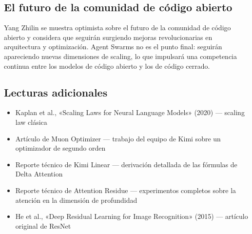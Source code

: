 \documentclass[a4paper]{article}
\begin{document}
\subsection{El futuro de la comunidad de código abierto}

Yang Zhilin se muestra optimista sobre el futuro de la comunidad de código abierto y considera que seguirán surgiendo mejoras revolucionarias en arquitectura y optimización. Agent Swarms no es el punto final: seguirán apareciendo nuevas dimensiones de scaling, lo que impulsará una competencia continua entre los modelos de código abierto y los de código cerrado.

\subsection{Lecturas adicionales}

\begin{itemize}
    \item Kaplan et al., «Scaling Laws for Neural Language Models» (2020) --- scaling law clásica
    \item Artículo de Muon Optimizer --- trabajo del equipo de Kimi sobre un optimizador de segundo orden
    \item Reporte técnico de Kimi Linear --- derivación detallada de las fórmulas de Delta Attention
    \item Reporte técnico de Attention Residue --- experimentos completos sobre la atención en la dimensión de profundidad
    \item He et al., «Deep Residual Learning for Image Recognition» (2015) --- artículo original de ResNet
\end{itemize}

\end{document}
